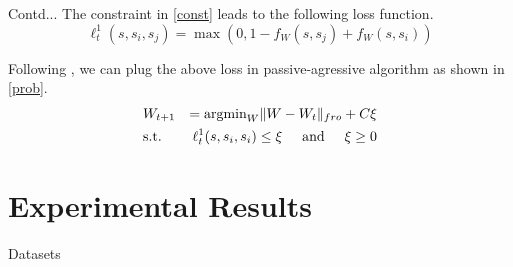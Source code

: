 \documentclass[blue]{beamer}
\begin{document}
\begin{frame}{Contd...}
The constraint in \eqref{const} leads to the following loss function.
    \begin{equation}\label{hinge}
        \ell^1_t(s,s_i,s_j) = \max(0,1-f_W(s,s_j)+f_W(s,s_i))
    \end{equation}
    
  Following  \cite{crammer2006online}, we can plug the above loss in passive-agressive algorithm as shown in \eqref{prob}.
    \begin{equation}\label{prob}
\begin{aligned}
& W_{t+1} &= \text{argmin}_W \|W-W_t\|_{fro} + C\xi \\
& \text{s.t.} &\ell^1_t(s,s_i,s_i) \leq \xi \hspace{0.5cm} \text{and}\hspace{0.5cm} \xi \geq 0
\end{aligned}
\end{equation}
\end{frame}
\section{Experimental Results}

\begin{frame}{Datasets}
\begin{table}[htbp]
\centering
\caption{Summary of  datasets  used in the experiment}
\label{data}
\end{table}
\end{frame}
\end{document}
